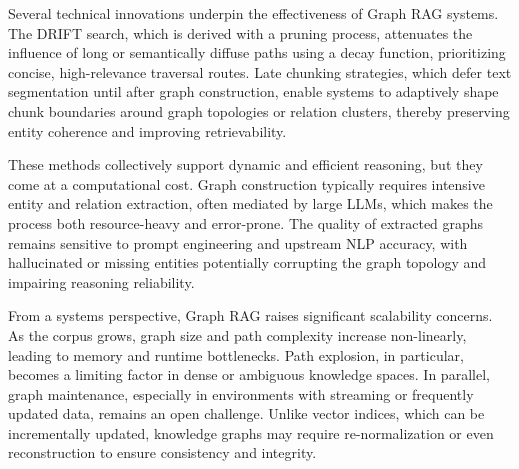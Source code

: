 \documentclass[12pt,twoside]{report}
\begin{document}
Several technical innovations underpin the effectiveness of Graph RAG systems. The DRIFT search\cite{DRIFT}, which is derived with a pruning process, attenuates the influence of long or semantically diffuse paths using a decay function, prioritizing concise, high-relevance traversal routes. Late chunking strategies, which defer text segmentation until after graph construction, enable systems to adaptively shape chunk boundaries around graph topologies or relation clusters, thereby preserving entity coherence and improving retrievability.

These methods collectively support dynamic and efficient reasoning, but they come at a computational cost. Graph construction typically requires intensive entity and relation extraction, often mediated by large LLMs, which makes the process both resource-heavy and error-prone. The quality of extracted graphs remains sensitive to prompt engineering and upstream NLP accuracy, with hallucinated or missing entities potentially corrupting the graph topology and impairing reasoning reliability.

From a systems perspective, Graph RAG raises significant scalability concerns. As the corpus grows, graph size and path complexity increase non-linearly, leading to memory and runtime bottlenecks. Path explosion, in particular, becomes a limiting factor in dense or ambiguous knowledge spaces. In parallel, graph maintenance, especially in environments with streaming or frequently updated data, remains an open challenge. Unlike vector indices, which can be incrementally updated, knowledge graphs may require re-normalization or even reconstruction to ensure consistency and integrity.
\end{document}
